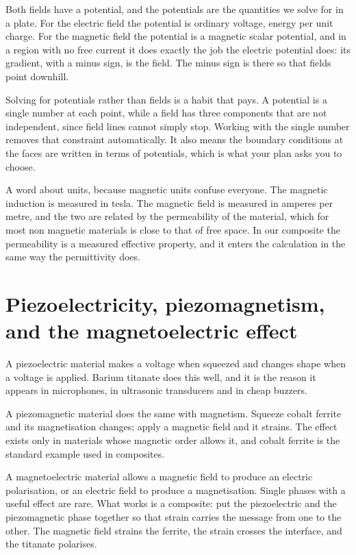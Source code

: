 \documentclass[11pt]{article}
\begin{document}
Both fields have a potential, and the potentials are the quantities we solve for in a plate. For the electric
field the potential is ordinary voltage, energy per unit charge. For the magnetic field the potential is a
magnetic scalar potential, and in a region with no free current it does exactly the job the electric potential
does: its gradient, with a minus sign, is the field. The minus sign is there so that fields point downhill.

Solving for potentials rather than fields is a habit that pays. A potential is a single number at each point,
while a field has three components that are not independent, since field lines cannot simply stop. Working
with the single number removes that constraint automatically. It also means the boundary conditions at the
faces are written in terms of potentials, which is what your plan asks you to choose.

A word about units, because magnetic units confuse everyone. The magnetic induction is measured in tesla. The
magnetic field is measured in amperes per metre, and the two are related by the permeability of the material,
which for most non magnetic materials is close to that of free space. In our composite the permeability is a
measured effective property, and it enters the calculation in the same way the permittivity does.

\section{Piezoelectricity, piezomagnetism, and the magnetoelectric effect}

A piezoelectric material makes a voltage when squeezed and changes shape when a voltage is applied. Barium
titanate does this well, and it is the reason it appears in microphones, in ultrasonic transducers and in
cheap buzzers.

A piezomagnetic material does the same with magnetism. Squeeze cobalt ferrite and its magnetisation changes;
apply a magnetic field and it strains. The effect exists only in materials whose magnetic order allows it, and
cobalt ferrite is the standard example used in composites.

A magnetoelectric material allows a magnetic field to produce an electric polarisation, or an electric field to
produce a magnetisation. Single phases with a useful effect are rare. What works is a composite: put the
piezoelectric and the piezomagnetic phase together so that strain carries the message from one to the other.
The magnetic field strains the ferrite, the strain crosses the interface, and the titanate polarises.
\end{document}
